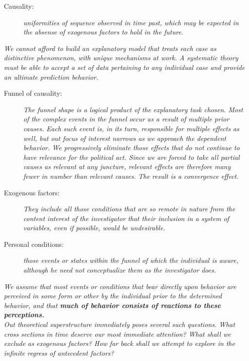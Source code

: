 \begin{description}
    \item [Causality: ] \textit{uniformities of sequence observed in time past, which may be expected in the absense of exogenous factors to hold in the future.} \cite[~p. 21]{campbell}
\end{description}

\noindent \textit{We cannot afford to build an explanatory model that treats each case as distinctive phenomenon, with unique mechanisms at work. A systematic theory must be able to accept a set of data pertaining to any individual case and provide an ultimate prediction behavior.} \cite[~p. 23]{campbell}

\begin{description}
    \item [Funnel of causality: ] \textit{The funnel shape is a logical product of the explanatory task chosen. Most of the complex events in the funnel occur as a result of multiple prior causes. Each such event is, in its turn, responsible for multiple effects as well, but out focus of interest narrows as we approach the dependent behavior. We progressively eliminate those effects that do not continue to have relevance for the political act. Since we are forced to take all partial causes as relevant at any juncture, relevant effects are therefore many fewer in number than relevant causes. The result is a convergence effect.} \cite[~p. 24]{campbell}

    \item [Exogenous factors: ] \textit{They include all those conditions that are so remote in nature from the content interest of the investigator that their inclusion in a system of variables, even if possible, would be undesirable.} \cite[~p. 25-26]{campbell}

    \item [Personal conditions: ] \textit{those events or states within the funnel of which the individual is aware, although he need not conceptualize them as the investigator does.} \cite[~p. 27]{campbell}
\end{description}

\noindent \textit{We assume that most events or conditions that bear directly upon behavior are perceived in some form or other by the individual prior to the determined behavior, and that \textbf{much of behavior consists of reactions to these perceptions.}} \cite[~p. 27]{campbell} \\

\noindent \textit{Out theoretical superstructure immediately poses several such questions. What cross sections in time deserve our most immediate attention? What shall we exclude as exogenous factors? How far back shall we attempt to explore in the infinite regress of antecedent factors?} \cite[~p. 33]{campbell} \\

